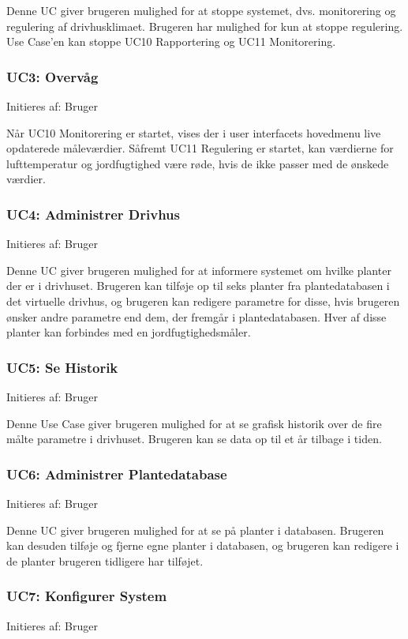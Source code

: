 Denne UC giver brugeren mulighed for at stoppe systemet, dvs. monitorering og regulering af drivhusklimaet. 
Brugeren har mulighed for kun at stoppe regulering. Use Case’en kan stoppe UC10 Rapportering og UC11 Monitorering.

\subsubsection{UC3: Overvåg}
Initieres af: Bruger

Når UC10 Monitorering er startet, vises der i user interfacets hovedmenu live opdaterede måleværdier. 
Såfremt UC11 Regulering er startet, kan værdierne for lufttemperatur og jordfugtighed være røde, hvis de ikke passer med de ønskede værdier.

\subsubsection{UC4: Administrer Drivhus}
Initieres af: Bruger

Denne UC giver brugeren mulighed for at informere systemet om hvilke planter der er i drivhuset. 
Brugeren kan tilføje op til seks planter fra plantedatabasen i det virtuelle drivhus, og brugeren kan redigere parametre for disse, hvis brugeren ønsker andre parametre end dem, der fremgår i plantedatabasen. 
Hver af disse planter kan forbindes med en jordfugtighedsmåler. 

\subsubsection{UC5: Se Historik}
Initieres af: Bruger

Denne Use Case giver brugeren mulighed for at se grafisk historik over de fire målte parametre i drivhuset. 
Brugeren kan se data op til et år tilbage i tiden. 

\subsubsection{UC6: Administrer Plantedatabase}
Initieres af: Bruger

Denne UC giver brugeren mulighed for at se på planter i databasen. 
Brugeren kan desuden tilføje og fjerne egne planter i databasen, og brugeren kan redigere i de planter brugeren tidligere har tilføjet. 

\subsubsection{UC7: Konfigurer System}
Initieres af: Bruger

